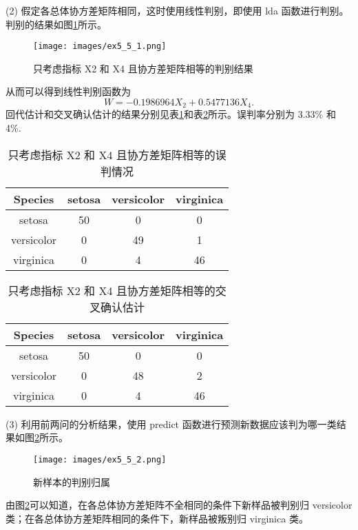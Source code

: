 \documentclass{ctexrep}
\begin{document}
(2) 假定各总体协方差矩阵相同，这时使用线性判别，即使用 lda 函数进行判别。判别的结果如图\ref{fig:ex551}所示。
\begin{figure}[h!]
\begin{center}
\texttt{[image: images/ex5\_5\_1.png]}
\end{center}
\caption{只考虑指标 X2 和 X4 且协方差矩阵相等的判别结果}
\label{fig:ex551}
\end{figure}

从而可以得到线性判别函数为
\begin{equation*}
W=-0.1986964X_2+0.5477136X_4.
\end{equation*}
回代估计和交叉确认估计的结果分别见表\ref{tab:ex553}和表\ref{tab:ex554}所示。误判率分别为 3.33\% 和 4\%.
\begin{table}[ht!]
\begin{center}
\begin{tabular}{c|ccc}
Species & setosa & versicolor & virginica \\
\hline
setosa & 50 & 0 & 0 \\
versicolor & 0 & 49 & 1 \\
virginica & 0 & 4 & 46
\end{tabular}
\end{center}
\caption{只考虑指标 X2 和 X4 且协方差矩阵相等的误判情况}
\label{tab:ex553}
\end{table}
\begin{table}[h!]
\begin{center}
\begin{tabular}{c|ccc}
Species & setosa & versicolor & virginica \\
\hline
setosa & 50 & 0 & 0 \\
versicolor & 0 & 48 & 2 \\
virginica & 0 & 4 & 46
\end{tabular}
\end{center}
\caption{只考虑指标 X2 和 X4 且协方差矩阵相等的交叉确认估计}
\label{tab:ex554}
\end{table}

(3) 利用前两问的分析结果，使用 predict 函数进行预测新数据应该判为哪一类结果如图\ref{fig:ex552}所示。
\begin{figure}[h!]
\begin{center}
\texttt{[image: images/ex5\_5\_2.png]}
\end{center}
\caption{新样本的判别归属}
\label{fig:ex552}
\end{figure}

由图\ref{fig:ex552}可以知道，在各总体协方差矩阵不全相同的条件下新样品被判别归 versicolor 类；在各总体协方差矩阵相同的条件下，新样品被叛别归 virginica 类。
\end{document}
